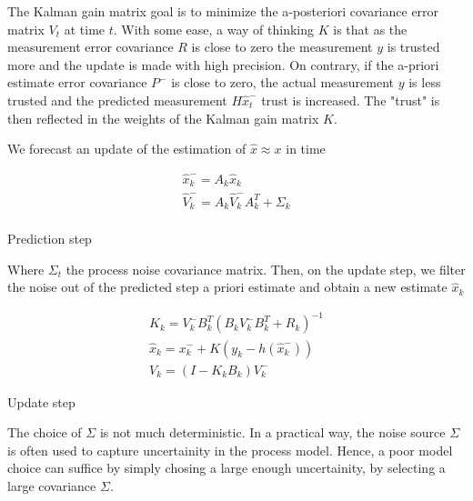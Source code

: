 \documentclass[mscthesis]{usiinfthesis}
\begin{document}
The Kalman gain matrix goal is to minimize the a-posteriori covariance error matrix $V_t$ at time $t$. With some ease, a way of thinking $K$ is that as the measurement error covariance $R$ is close to zero the measurement $y$ is trusted more and the update is made with high precision. On contrary, if the a-priori estimate error covariance $P^-$ is close to zero, the actual measurement $y$ is less trusted and the predicted measurement $H\hat{x}_t^-$ trust is increased. The "trust" is then reflected in the weights of the Kalman gain matrix $K$.

We forecast an update of the estimation of $\hat{x} \approx x$ in time

\begin{eqfloat}[H]
\begin{equation}
\begin{array}{l}
\hat{x}_k^- = A_k \hat{x}_k  \\
\hat{V}_k^- = A_k \hat{V}_k^- A_k^T + \Sigma_k \\
\end{array}
\label{eq:kalman_predict}
\end{equation}
\caption{Prediction step}
\label{eq:linear_kalmann_prediction}
\end{eqfloat}

Where $\Sigma_{t}$ the process noise covariance matrix. Then, on the update step, we filter the noise out of the predicted step a priori estimate and obtain a new estimate $\hat{x}_k$

\begin{eqfloat}[H]
\begin{equation}
\begin{array}{l}
K_k = V_k^- B^T_k (B_k V_k^- B^T_k + R_k)^{-1} \\
\hat{x}_k = x_k^- + K (y_k - h(\hat{x}_k^-)) \\
V_k = (I-K_k B_k)V_k^-
\end{array}
\label{eq:kalman_update}
\end{equation}
\caption{Update step}
\label{eq:linear_kalmann_update}
\end{eqfloat}

The choice of $\Sigma$ is not much deterministic. In a practical way, the noise source $\Sigma$ is often used to capture uncertainity in the process model. Hence, a poor model choice can suffice by simply chosing a large enough uncertainity, by selecting a large covariance $\Sigma$. 


\end{document}

